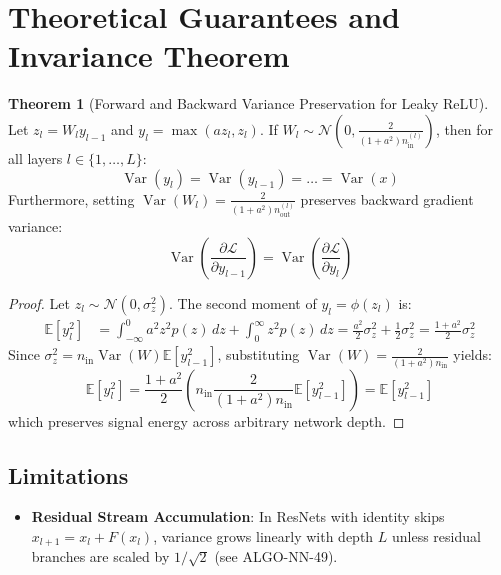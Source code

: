 \documentclass[11pt,a4paper]{article}
\theoremstyle{definition}
\newtheorem{theorem}{Theorem}[section]
\begin{document}
\section{Theoretical Guarantees and Invariance Theorem}

\begin{theorem}[Forward and Backward Variance Preservation for Leaky ReLU]
Let $z_l = W_l y_{l-1}$ and $y_l = \max(a z_l, z_l)$. If $W_l \sim \mathcal{N}\left(0, \frac{2}{(1 + a^2) n_{\text{in}}^{(l)}}\right)$, then for all layers $l \in \{1, \dots, L\}$:
\begin{equation}
\operatorname{Var}(y_l) = \operatorname{Var}(y_{l-1}) = \dots = \operatorname{Var}(x)
\end{equation}
Furthermore, setting $\operatorname{Var}(W_l) = \frac{2}{(1 + a^2) n_{\text{out}}^{(l)}}$ preserves backward gradient variance:
\begin{equation}
\operatorname{Var}\left(\frac{\partial \mathcal{L}}{\partial y_{l-1}}\right) = \operatorname{Var}\left(\frac{\partial \mathcal{L}}{\partial y_l}\right)
\end{equation}
\end{theorem}

\begin{proof}
Let $z_l \sim \mathcal{N}(0, \sigma_z^2)$. The second moment of $y_l = \phi(z_l)$ is:
\begin{align}
\mathbb{E}[y_l^2] &= \int_{-\infty}^0 a^2 z^2 p(z) \, dz + \int_0^\infty z^2 p(z) \, dz = \frac{a^2}{2} \sigma_z^2 + \frac{1}{2} \sigma_z^2 = \frac{1 + a^2}{2} \sigma_z^2
\end{align}
Since $\sigma_z^2 = n_{\text{in}} \operatorname{Var}(W) \mathbb{E}[y_{l-1}^2]$, substituting $\operatorname{Var}(W) = \frac{2}{(1+a^2) n_{\text{in}}}$ yields:
\begin{equation}
\mathbb{E}[y_l^2] = \frac{1 + a^2}{2} \left( n_{\text{in}} \frac{2}{(1 + a^2) n_{\text{in}}} \mathbb{E}[y_{l-1}^2] \right) = \mathbb{E}[y_{l-1}^2]
\end{equation}
which preserves signal energy across arbitrary network depth.
\end{proof}

\subsection{Limitations}
\begin{itemize}
    \item \textbf{Residual Stream Accumulation}: In ResNets with identity skips $x_{l+1} = x_l + F(x_l)$, variance grows linearly with depth $L$ unless residual branches are scaled by $1 / \sqrt{2}$ (see ALGO-NN-49).
\end{itemize}
\end{document}
